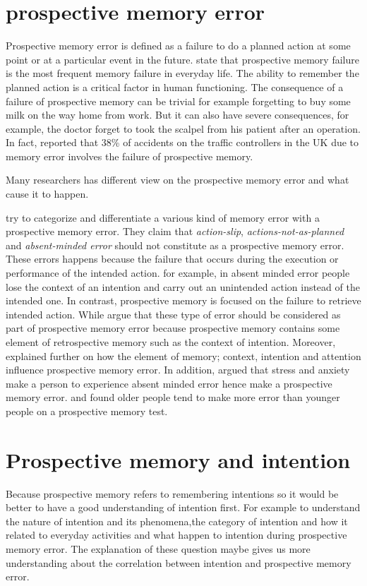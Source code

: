 \section{prospective memory error}

Prospective memory error is defined as a failure to do a planned action at some point or at a particular event in the future. \cite{Kliegel1984} state that prospective memory failure is the most frequent memory failure in everyday life.  The ability to remember the planned action is a critical factor in human functioning. The consequence of a failure of prospective memory can be trivial for example forgetting to buy some milk on the way home from work. But it can also have severe consequences, for example, the doctor forget to took the scalpel from his patient after an operation. In fact, \cite{Shorrock2005} reported that 38\% of accidents on the traffic controllers in the UK due to memory error involves the failure of prospective memory.


Many researchers has different view on the prospective memory error and what cause it to happen.

\cite{LiaKvavilashviliAndJudiEllis} try to categorize and differentiate a various kind of memory error with a prospective memory error. They claim that \textit{action-slip}\citep{HeckhausenHeinz1990IAaA}, \textit{actions-not-as-planned} \citep{Reason1979-REAANA-2} and \textit{absent-minded error} \citep{cohen2008memory} should not constitute as a prospective memory error. These errors happens because the failure that occurs during the execution or performance of the intended action. for example, in absent minded error people lose the context of an intention and carry out an unintended action instead of the intended one. In contrast, prospective memory is focused on the failure to retrieve intended action.
While \cite{10.1371/journal.pone.0074447} argue that these type of error should be considered as part of prospective memory error because prospective memory contains some element of retrospective memory such as the context of intention. Moreover, \cite{Reason1984} explained further on how the element of memory; context, intention and attention influence prospective memory error.  In addition, \cite{Cockburn1994} argued that stress and anxiety make a person to experience absent minded error hence make a prospective memory error.  and \cite{Scullin2012} found older people tend to make more error than younger people on a prospective memory test.

\section{Prospective memory and intention}
Because prospective memory refers to remembering intentions so it would be better to have a good understanding of intention first. For example to understand the nature of intention and its phenomena,the category of intention and how it related to everyday activities and what happen to intention during prospective memory error. The explanation of these question maybe gives us more understanding about the correlation between intention and prospective memory error.

